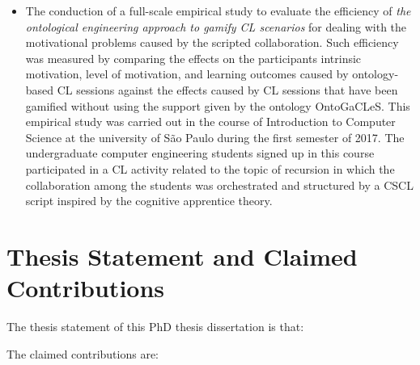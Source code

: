 \begin{description}
\begin{itemize}
\item
The conduction of a full-scale empirical study to evaluate the efficiency of \emph{the ontological engineering approach to gamify CL scenarios} for dealing with the motivational problems caused by the scripted collaboration. Such efficiency was measured by comparing the effects on the participants intrinsic motivation, level of motivation, and learning outcomes caused by ontology-based CL sessions against the effects caused by CL sessions that have been gamified without using the support given by the ontology OntoGaCLeS. This empirical study was carried out in the course of Introduction to Computer Science at the university of São Paulo during the first semester of 2017. The undergraduate computer engineering students signed up in this course participated in a CL activity related to the topic of recursion in which the collaboration among the students was orchestrated and structured by a CSCL script inspired by the cognitive apprentice theory.
\end{itemize}
\end{description}

\section{Thesis Statement and Claimed Contributions}
\label{sec:thesis-statement-and-claimed-contributions}

The thesis statement of this PhD thesis dissertation is that:


The claimed contributions are:

